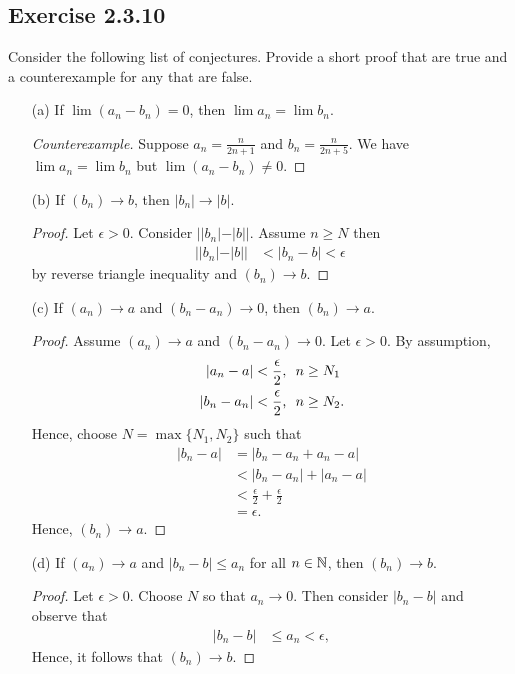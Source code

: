 \subsection{Exercise 2.3.10} Consider the following list of conjectures. Provide a short proof that are true and a counterexample for any that are false.
\begin{enumerate}
    \item[(a)] If \( \lim (a_n - b_n) = 0 \), then \( \lim a_n = \lim b_n\). 
        \begin{proof}[Counterexample]
        Suppose \( a_n = \frac{n}{2n+1}\) and \( b_n = \frac{n}{2n+5}\). We have \( \lim a_n = \lim b_n \) but \( \lim (a_n - b_n ) \neq 0\).
        \end{proof}
    \item[(b)] If \( (b_n) \to b\), then \( | b_n | \to | b |\).
        \begin{proof}
        Let \( \epsilon > 0\). Consider \( | |b_n| - |b|| \). Assume \( n \geq N \) then 
        \begin{align*}
           | |b_n| - |b|| &< | b_n - b| < \epsilon   \
        \end{align*}
        by reverse triangle inequality and \( (b_n) \to b\).
        \end{proof}
    \item[(c)] If \( (a_n) \to a\) and \( (b_n - a_n) \to 0\), then \( (b_n) \to a\).
        \begin{proof}
        Assume \( (a_n) \to a\) and \( (b_n - a_n) \to 0\). Let \( \epsilon  > 0\). By assumption, 
        \begin{align*}
            | a_n - a | &< \frac{ \epsilon }{2}  \text{,   \space  }  n \geq N_1\\
            | b_n - a_n | &< \frac{ \epsilon }{2} \text{, \space } n \geq N_2.
        \end{align*}
        Hence, choose \(  N = \max \{ N_1, N_2 \} \) such that 
        \begin{align*}
        | b_n - a |&= | b_n - a_n + a_n - a  | \\
                   &< | b_n - a_n | + | a_n - a | \\
                   &< \frac{ \epsilon }{2} + \frac{ \epsilon }{2} \\ 
                   &= \epsilon. 
        \end{align*}
        Hence, \( (b_n) \to a\).
        \end{proof}
    \item[(d)]If \( (a_n) \to a\) and \( | b_n - b | \leq a_n \) for all \( n \in \mathbb{N} \), then \( (b_n) \to b\).
        \begin{proof}
        Let \( \epsilon > 0\). Choose \( N \) so that \( a_n \to 0 \). Then consider \( |b_n - b |\) and observe that
        \begin{align*}
        | b_n - b| &\leq a_n < \epsilon, 
        \end{align*}
        Hence, it follows that \( (b_n ) \to b\).
        \end{proof}
\end{enumerate}




